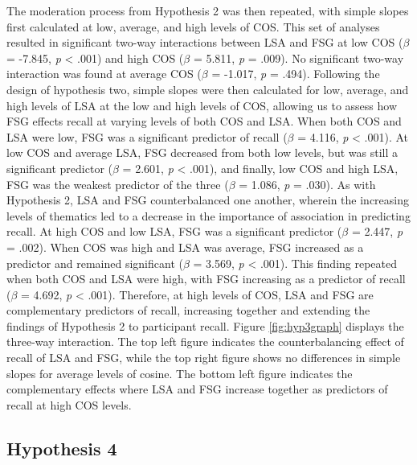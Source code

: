 \documentclass[english,man]{apa6}
\theoremstyle{definition}
\theoremstyle{definition}
\theoremstyle{remark}
\begin{document}
The moderation process from Hypothesis 2 was then repeated, with simple
slopes first calculated at low, average, and high levels of COS. This
set of analyses resulted in significant two-way interactions between LSA
and FSG at low COS (\(\beta\) = -7.845, \emph{p} \textless{} .001) and
high COS (\(\beta\) = 5.811, \emph{p} = .009). No significant two-way
interaction was found at average COS (\(\beta\) = -1.017, \emph{p} =
.494). Following the design of hypothesis two, simple slopes were then
calculated for low, average, and high levels of LSA at the low and high
levels of COS, allowing us to assess how FSG effects recall at varying
levels of both COS and LSA. When both COS and LSA were low, FSG was a
significant predictor of recall (\(\beta\) = 4.116, \emph{p} \textless{}
.001). At low COS and average LSA, FSG decreased from both low levels,
but was still a significant predictor (\(\beta\) = 2.601, \emph{p}
\textless{} .001), and finally, low COS and high LSA, FSG was the
weakest predictor of the three (\(\beta\) = 1.086, \emph{p} = .030). As
with Hypothesis 2, LSA and FSG counterbalanced one another, wherein the
increasing levels of thematics led to a decrease in the importance of
association in predicting recall. At high COS and low LSA, FSG was a
significant predictor (\(\beta\) = 2.447, \emph{p} = .002). When COS was
high and LSA was average, FSG increased as a predictor and remained
significant (\(\beta\) = 3.569, \emph{p} \textless{} .001). This finding
repeated when both COS and LSA were high, with FSG increasing as a
predictor of recall (\(\beta\) = 4.692, \emph{p} \textless{} .001).
Therefore, at high levels of COS, LSA and FSG are complementary
predictors of recall, increasing together and extending the findings of
Hypothesis 2 to participant recall. Figure \ref{fig:hyp3graph} displays
the three-way interaction. The top left figure indicates the
counterbalancing effect of recall of LSA and FSG, while the top right
figure shows no differences in simple slopes for average levels of
cosine. The bottom left figure indicates the complementary effects where
LSA and FSG increase together as predictors of recall at high COS
levels.

\subsection{Hypothesis 4}\label{hypothesis-4}
\end{document}
